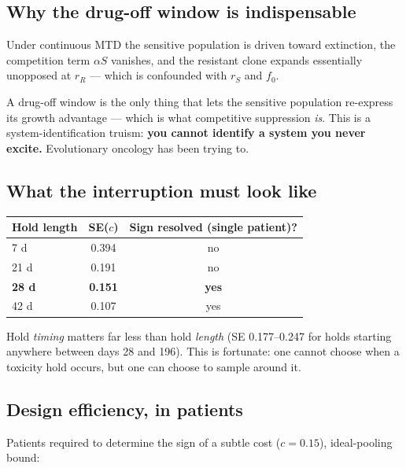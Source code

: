 \documentclass[11pt,a4paper]{article}
\begin{document}
\subsection{Why the drug-off window is indispensable}

Under continuous MTD the sensitive population is driven toward extinction, the
competition term $\alpha S$ vanishes, and the resistant clone expands essentially
unopposed at $r_R$ --- which is confounded with $r_S$ and $f_0$.

\begin{tcolorbox}[keybox]
A drug-off window is the only thing that lets the sensitive population re-express
its growth advantage --- which is what competitive suppression \emph{is}. This is a
system-identification truism: \textbf{you cannot identify a system you never
excite.} Evolutionary oncology has been trying to.
\end{tcolorbox}

\subsection{What the interruption must look like}

\begin{center}
\begin{tabular}{lcc}
\toprule
\textbf{Hold length} & \textbf{SE($c$)} & \textbf{Sign resolved (single patient)?}\\
\midrule
7 d & 0.394 & no\\
21 d & 0.191 & no\\
\textbf{28 d} & \textbf{0.151} & \textbf{yes}\\
42 d & 0.107 & yes\\
\bottomrule
\end{tabular}
\end{center}

Hold \emph{timing} matters far less than hold \emph{length} (SE 0.177--0.247 for
holds starting anywhere between days 28 and 196). This is fortunate: one cannot
choose when a toxicity hold occurs, but one can choose to sample around it.

\subsection{Design efficiency, in patients}

Patients required to determine the sign of a subtle cost ($c = 0.15$), ideal-pooling
bound:
\end{document}
